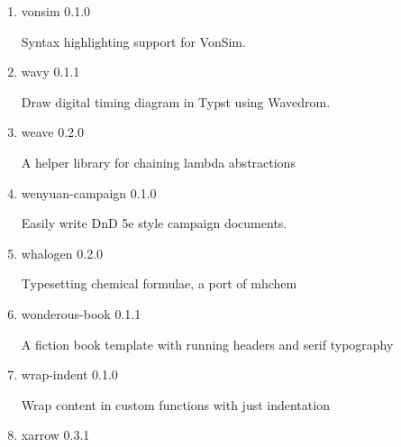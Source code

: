 \begin{enumerate}

  { vienna-tech } { 0.1.2 }

  An unofficial template for writing thesis at the TU Wien civil- and
  environmental engineering faculty.
\item
  \href{/universe/package/vonsim/}{}

  { vonsim } { 0.1.0 }

  Syntax highlighting support for VonSim.
\item
  \href{/universe/package/wavy/}{}

  { wavy } { 0.1.1 }

  Draw digital timing diagram in Typst using Wavedrom.
\item
  \href{/universe/package/weave/}{}

  { weave } { 0.2.0 }

  A helper library for chaining lambda abstractions
\item
  \href{/universe/package/wenyuan-campaign/}{}


  { wenyuan-campaign } { 0.1.0 }

  Easily write DnD 5e style campaign documents.
\item
  \href{/universe/package/whalogen/}{}

  { whalogen } { 0.2.0 }

  Typesetting chemical formulae, a port of mhchem
\item
  \href{/universe/package/wonderous-book/}{}


  { wonderous-book } { 0.1.1 }

  A fiction book template with running headers and serif typography
\item
  \href{/universe/package/wrap-indent/}{}

  { wrap-indent } { 0.1.0 }

  Wrap content in custom functions with just indentation
\item
  \href{/universe/package/xarrow/}{}

  { xarrow } { 0.3.1 }


\end{enumerate}
